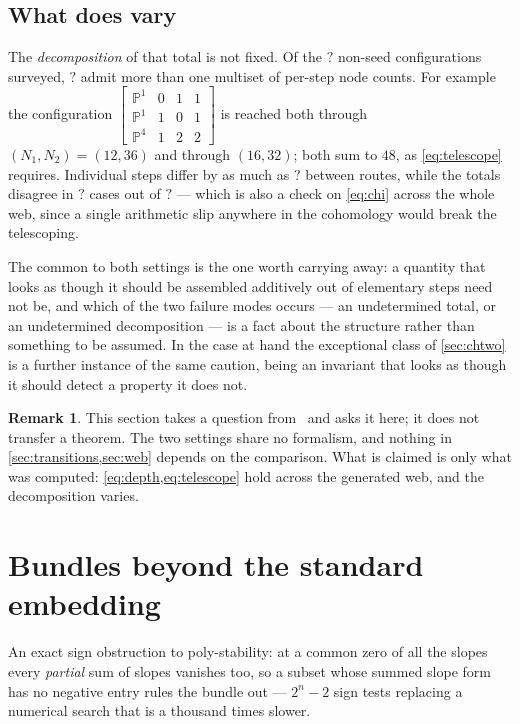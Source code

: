 \documentclass[11pt,a4paper]{article}
\newcommand{\FactAddChecked}{?}\newcommand{\FactAddMultiple}{?}
\newcommand{\FactAddMismatch}{?}\newcommand{\FactAddSpread}{?}
\newcommand{\PP}{\mathbb{P}}
\theoremstyle{definition}
\newtheorem{remark}{Remark}
\begin{document}
\subsection{What does vary}

The \emph{decomposition} of that total is not fixed. Of the
$\FactAddChecked$ non-seed configurations surveyed, $\FactAddMultiple$ admit
more than one multiset of per-step node counts. For example the configuration
$\left[\begin{smallmatrix}\PP^1&0&1&1\\ \PP^1&1&0&1\\
\PP^4&1&2&2\end{smallmatrix}\right]$ is reached both through
$(N_1,N_2) = (12,36)$ and through $(16,32)$; both sum to $48$, as
\cref{eq:telescope} requires. Individual steps differ by as much as
$\FactAddSpread$ between routes, while the totals disagree in
$\FactAddMismatch$ cases out of $\FactAddChecked$ --- which is also a check on
\cref{eq:chi} across the whole web, since a single arithmetic slip anywhere
in the cohomology would break the telescoping.

The common to both settings is the one worth carrying away: a quantity that looks as though it should be
assembled additively out of elementary steps need not be, and which of the
two failure modes occurs --- an undetermined total, or an undetermined
decomposition --- is a fact about the structure rather than something to be
assumed. In the case at hand the exceptional class of \cref{sec:chtwo} is a
further instance of the same caution, being an invariant that looks as though
it should detect a property it does not.

\begin{remark}
This section takes a question from~\cite{Brittenham2025} and asks it here; it
does not transfer a theorem. The two settings share no formalism, and nothing
in \cref{sec:transitions,sec:web} depends on the comparison. What is claimed
is only what was computed: \cref{eq:depth,eq:telescope} hold across the
generated web, and the decomposition varies.
\end{remark}

\section{Bundles beyond the standard embedding}
\label{sec:bundles}

An exact sign obstruction to poly-stability: at a common zero of all the slopes every \emph{partial} sum of
slopes vanishes too, so a subset whose summed slope form has no negative entry
rules the bundle out --- $2^n-2$ sign tests replacing a numerical search that
is a thousand times slower. 
\end{document}
